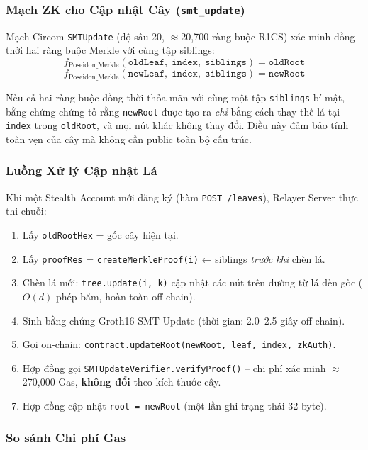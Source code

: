\documentclass[../DoAn.tex]{subfiles}
\begin{document}
\subsubsection{Mạch ZK cho Cập nhật Cây (\texttt{smt\_update})}

Mạch Circom \texttt{SMTUpdate} (độ sâu 20, $\approx$20,700 ràng buộc R1CS) xác minh đồng thời hai ràng buộc Merkle với cùng tập siblings:
\[
    f_{\text{Poseidon\_Merkle}}\!\left(\texttt{oldLeaf},\; \texttt{index},\; \texttt{siblings}\right) = \texttt{oldRoot}
\]
\[
    f_{\text{Poseidon\_Merkle}}\!\left(\texttt{newLeaf},\; \texttt{index},\; \texttt{siblings}\right) = \texttt{newRoot}
\]

Nếu cả hai ràng buộc đồng thời thỏa mãn với cùng một tập \texttt{siblings} bí mật, bằng chứng chứng tỏ rằng \texttt{newRoot} được tạo ra \textit{chỉ} bằng cách thay thế lá tại \texttt{index} trong \texttt{oldRoot}, và mọi nút khác không thay đổi. Điều này đảm bảo tính toàn vẹn của cây mà không cần public toàn bộ cấu trúc.

\subsubsection{Luồng Xử lý Cập nhật Lá}

Khi một Stealth Account mới đăng ký (hàm \texttt{POST /leaves}), Relayer Server thực thi chuỗi:

\begin{enumerate}
    \item Lấy \texttt{oldRootHex} = gốc cây hiện tại.
    \item Lấy \texttt{proofRes} = \texttt{createMerkleProof(i)} ← siblings \textit{trước khi} chèn lá.
    \item Chèn lá mới: \texttt{tree.update(i, k)} cập nhật các nút trên đường từ lá đến gốc ($O(d)$ phép băm, hoàn toàn off-chain).
    \item Sinh bằng chứng Groth16 SMT Update (thời gian: 2.0--2.5 giây off-chain).
    \item Gọi on-chain: \texttt{contract.updateRoot(newRoot, leaf, index, zkAuth)}.
    \item Hợp đồng gọi \texttt{SMTUpdateVerifier.verifyProof()} -- chi phí xác minh $\approx$270,000 Gas, \textbf{không đổi} theo kích thước cây.
    \item Hợp đồng cập nhật \texttt{root = newRoot} (một lần ghi trạng thái 32 byte).
\end{enumerate}

\subsubsection{So sánh Chi phí Gas}
\end{document}
